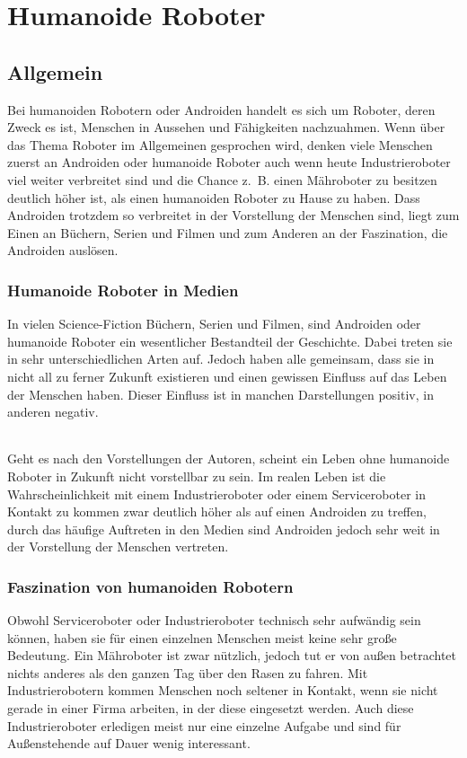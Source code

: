 \chapter{Humanoide Roboter}\label{sec:humanoide-roboter}
\section{Allgemein}\label{sec:allgemein}
Bei humanoiden Robotern oder Androiden handelt es sich um Roboter,
deren Zweck es ist, Menschen in Aussehen und Fähigkeiten nachzuahmen. Wenn über
das Thema Roboter im Allgemeinen gesprochen wird, denken viele Menschen zuerst
an Androiden oder humanoide Roboter auch wenn heute Industrieroboter viel
weiter verbreitet sind und die Chance z.~B. einen Mähroboter zu besitzen
deutlich höher ist, als einen humanoiden Roboter zu Hause zu haben. Dass
Androiden trotzdem so verbreitet in der Vorstellung der Menschen sind, liegt
zum Einen an Büchern, Serien und Filmen und zum Anderen an der Faszination, die
Androiden auslösen. \cite{Dautenhahn2011}

\subsection{Humanoide Roboter in Medien}
In vielen Science-Fiction Büchern, Serien und Filmen, sind Androiden oder
humanoide Roboter ein wesentlicher Bestandteil der Geschichte. Dabei treten sie
in sehr unterschiedlichen Arten auf. Jedoch haben alle gemeinsam, dass sie in
nicht all zu ferner Zukunft existieren und einen gewissen Einfluss auf das Leben
der Menschen haben. Dieser Einfluss ist in manchen Darstellungen positiv, in
anderen negativ.

\subparagraph{}
Geht es nach den Vorstellungen der Autoren,
scheint ein Leben ohne humanoide Roboter in Zukunft nicht vorstellbar zu sein.
Im realen Leben ist die Wahrscheinlichkeit mit einem Industrieroboter oder einem
Serviceroboter in Kontakt zu kommen zwar deutlich höher als auf einen Androiden
zu treffen, durch das häufige Auftreten in den Medien sind Androiden jedoch
sehr weit in der Vorstellung der Menschen vertreten. \cite{Dautenhahn2011}

\subsection{Faszination von humanoiden Robotern}
Obwohl Serviceroboter oder Industrieroboter technisch sehr aufwändig sein
können, haben sie für einen einzelnen Menschen meist keine sehr große Bedeutung.
Ein Mähroboter ist zwar nützlich, jedoch tut er von außen betrachtet nichts
anderes als den ganzen Tag über den Rasen zu fahren. Mit Industrierobotern
kommen Menschen noch seltener in Kontakt, wenn sie nicht gerade in einer Firma
arbeiten, in der diese eingesetzt werden. Auch diese Industrieroboter erledigen
meist nur eine einzelne Aufgabe und sind für Außenstehende auf Dauer wenig
interessant.

